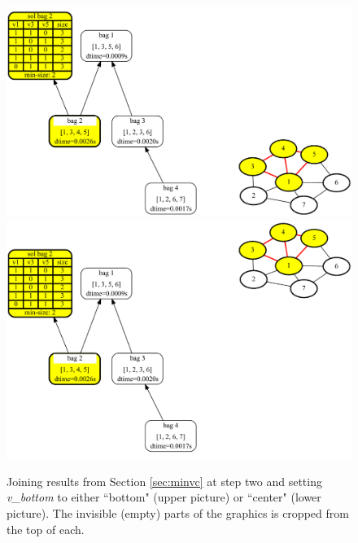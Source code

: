 \documentclass[a4paper, 12pt, bibliography=totoc]{scrartcl}
\begin{document}
\begin{figure}[H]
	\centering 
	
	\includegraphics[width=\linewidth]{images/SVGJOIN/default_bottom2.pdf}\\[1.5ex]
	\includegraphics[width=\linewidth]{images/SVGJOIN/default_center2.pdf}
	\caption[Joining results and shifting vertically to bottom and center]{Joining results from Section \ref{sec:minvc} at step two and setting \textit{v\_bottom} to either ``bottom" (upper picture) or ``center" (lower picture). The invisible (empty) parts of the graphics is cropped from the top of each.}
	\label{fig:joinbotcenter}
\end{figure}
\end{document}
